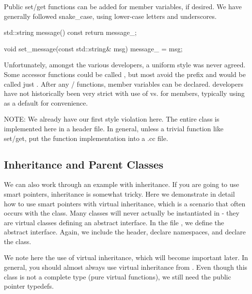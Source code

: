 Public set/get functions can be added for member variables, if desired.
We have generally followed snake\_case, using lower-case letters and underscores.

\begin{CppCode}
  std::string message() const {
    return message_;
   }

  void set_message(const std::string& msg){
    message_ = msg;
  }
\end{CppCode}
Unfortunately, amongst the various developers, a uniform style was never agreed.
Some accessor functions could be called , but most avoid the prefix and would be called just .
After any / functions, member variables can be declared.
\sstmacro developers have not historically been very strict with use of  vs.  for members, typically using  as a default for convenience. 

NOTE: We already have our first style violation here.  The entire class is implemented here in a header file.
In general, unless a trivial function like set/get, put the function implementation into a .cc file.

\subsection{Inheritance and Parent Classes}\label{subsec:inheritance}
We can also work through an example with inheritance.  
If you are going to use smart pointers, inheritance is somewhat tricky.  
Here we demonstrate in detail how to use smart pointers with virtual inheritance, 
which is a scenario that often occurs with the  class.
Many classes will never actually be instantiated in \sstmacro - they are virtual classes defining an abstract interface.
In the file , we define the  abstract interface. Again, we include the header,
declare namespaces, and declare the class.

\begin{CppCode}
#include <sprockit/ptr_type.h>

namespace sstmac {
    namespace tutorial {
    
class gem :
  virtual public sprockit::ptr_type
{
\end{CppCode}
We note here the use of virtual inheritance, which will become important later.
In general, you should almost always use virtual inheritance from .
Even though this class is not a complete type (pure virtual functions), we still need the public pointer typedefs.

